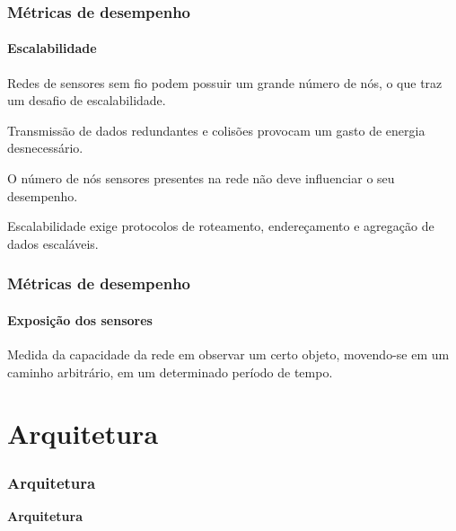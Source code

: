 \documentclass[notes]{beamer}
\begin{document}
\begin{frame}
\label{slide_27}
\frametitle{Métricas de desempenho}
\framesubtitle{Escalabilidade}

\begin{block}

Redes de sensores sem fio podem possuir um grande número de nós, o que traz um desafio de escalabilidade. 
\end{block} \pause

\begin{alertblock}

Transmissão de dados redundantes e colisões provocam um gasto de energia desnecessário.  
\end{alertblock} \pause

\begin{alertblock}

O número de nós sensores presentes na rede não deve influenciar o seu desempenho. 
\end{alertblock} \pause

\begin{block}

Escalabilidade exige protocolos de roteamento, endereçamento e agregação de dados escaláveis.

\end{block}

\end{frame}

\begin{frame}
\label{slide_28}
\frametitle{Métricas de desempenho}
\framesubtitle{Exposição dos sensores}

\begin{block}

Medida da capacidade da rede em observar um certo objeto, movendo-se em um caminho arbitrário, em um determinado período de tempo.
 
\end{block} 

\end{frame}

\section{Arquitetura}
\begin{frame}
\label{slide_29}
\frametitle{Arquitetura}

\begin{block}

 \center \textbf{Arquitetura}
 
\end{block}

\end{frame}
\end{document}
